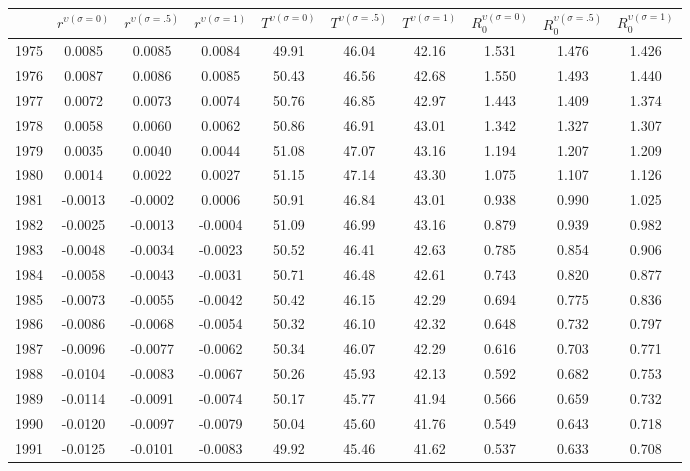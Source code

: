 \begin{tabular}{cccccccccc}
  \hline
 & $r^{\upsilon (\sigma = 0)}$ & $r^{\upsilon (\sigma = .5)}$ & $r^{\upsilon (\sigma = 1)}$ & $T^{\upsilon (\sigma = 0)}$ & $T^{\upsilon (\sigma = .5)}$ & $T^{\upsilon (\sigma = 1)}$ & $R_0^{\upsilon (\sigma = 0)}$ & $R_0^{\upsilon (\sigma = .5)}$ & $R_0^{\upsilon (\sigma = 1)}$ \\ 
  \hline
1975 & 0.0085 & 0.0085 & 0.0084 & 49.91 & 46.04 & 42.16 & 1.531 & 1.476 & 1.426 \\ 
  1976 & 0.0087 & 0.0086 & 0.0085 & 50.43 & 46.56 & 42.68 & 1.550 & 1.493 & 1.440 \\ 
  1977 & 0.0072 & 0.0073 & 0.0074 & 50.76 & 46.85 & 42.97 & 1.443 & 1.409 & 1.374 \\ 
  1978 & 0.0058 & 0.0060 & 0.0062 & 50.86 & 46.91 & 43.01 & 1.342 & 1.327 & 1.307 \\ 
  1979 & 0.0035 & 0.0040 & 0.0044 & 51.08 & 47.07 & 43.16 & 1.194 & 1.207 & 1.209 \\ 
  1980 & 0.0014 & 0.0022 & 0.0027 & 51.15 & 47.14 & 43.30 & 1.075 & 1.107 & 1.126 \\ 
  1981 & -0.0013 & -0.0002 & 0.0006 & 50.91 & 46.84 & 43.01 & 0.938 & 0.990 & 1.025 \\ 
  1982 & -0.0025 & -0.0013 & -0.0004 & 51.09 & 46.99 & 43.16 & 0.879 & 0.939 & 0.982 \\ 
  1983 & -0.0048 & -0.0034 & -0.0023 & 50.52 & 46.41 & 42.63 & 0.785 & 0.854 & 0.906 \\ 
  1984 & -0.0058 & -0.0043 & -0.0031 & 50.71 & 46.48 & 42.61 & 0.743 & 0.820 & 0.877 \\ 
  1985 & -0.0073 & -0.0055 & -0.0042 & 50.42 & 46.15 & 42.29 & 0.694 & 0.775 & 0.836 \\ 
  1986 & -0.0086 & -0.0068 & -0.0054 & 50.32 & 46.10 & 42.32 & 0.648 & 0.732 & 0.797 \\ 
  1987 & -0.0096 & -0.0077 & -0.0062 & 50.34 & 46.07 & 42.29 & 0.616 & 0.703 & 0.771 \\ 
  1988 & -0.0104 & -0.0083 & -0.0067 & 50.26 & 45.93 & 42.13 & 0.592 & 0.682 & 0.753 \\ 
  1989 & -0.0114 & -0.0091 & -0.0074 & 50.17 & 45.77 & 41.94 & 0.566 & 0.659 & 0.732 \\ 
  1990 & -0.0120 & -0.0097 & -0.0079 & 50.04 & 45.60 & 41.76 & 0.549 & 0.643 & 0.718 \\ 
  1991 & -0.0125 & -0.0101 & -0.0083 & 49.92 & 45.46 & 41.62 & 0.537 & 0.633 & 0.708 \\ 

\end{tabular}
